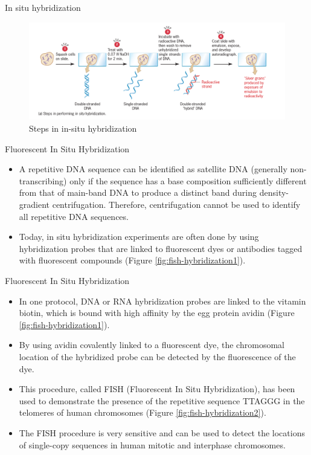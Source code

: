 \documentclass[
  ignorenonframetext,
  aspectratio=169]{beamer}
\providecommand{\tightlist}{%
  \setlength{\itemsep}{0pt}\setlength{\parskip}{0pt}}
\begin{document}
\begin{frame}{In situ hybridization}
\protect\hypertarget{in-situ-hybridization}{}
\begin{figure}
\includegraphics[width=0.75\linewidth]{./../images/insitu_hybrid_steps} \caption{Steps in in-situ hybridization}\label{fig:insitu-hybridization}
\end{figure}
\end{frame}

\begin{frame}{Fluorescent In Situ Hybridization}
\protect\hypertarget{fluorescent-in-situ-hybridization}{}
\begin{itemize}
\tightlist
\item
  A repetitive DNA sequence can be identified as satellite DNA
  (generally non-transcribing) only if the sequence has a base
  composition sufficiently different from that of main-band DNA to
  produce a distinct band during density-gradient centrifugation.
  Therefore, centrifugation cannot be used to identify all repetitive
  DNA sequences.
\item
  Today, in situ hybridization experiments are often done by using
  hybridization probes that are linked to fluorescent dyes or antibodies
  tagged with fluorescent compounds (Figure
  \ref{fig:fish-hybridization1}).
\end{itemize}
\end{frame}

\begin{frame}{Fluorescent In Situ Hybridization}
\protect\hypertarget{fluorescent-in-situ-hybridization-1}{}
\begin{itemize}
\tightlist
\item
  In one protocol, DNA or RNA hybridization probes are linked to the
  vitamin biotin, which is bound with high affinity by the egg protein
  avidin (Figure \ref{fig:fish-hybridization1}).
\item
  By using avidin covalently linked to a fluorescent dye, the
  chromosomal location of the hybridized probe can be detected by the
  fluorescence of the dye.
\item
  This procedure, called FISH (Fluorescent In Situ Hybridization), has
  been used to demonstrate the presence of the repetitive sequence
  TTAGGG in the telomeres of human chromosomes (Figure
  \ref{fig:fish-hybridization2}).
\item
  The FISH procedure is very sensitive and can be used to detect the
  locations of single-copy sequences in human mitotic and interphase
  chromosomes.
\end{itemize}
\end{frame}
\end{document}

